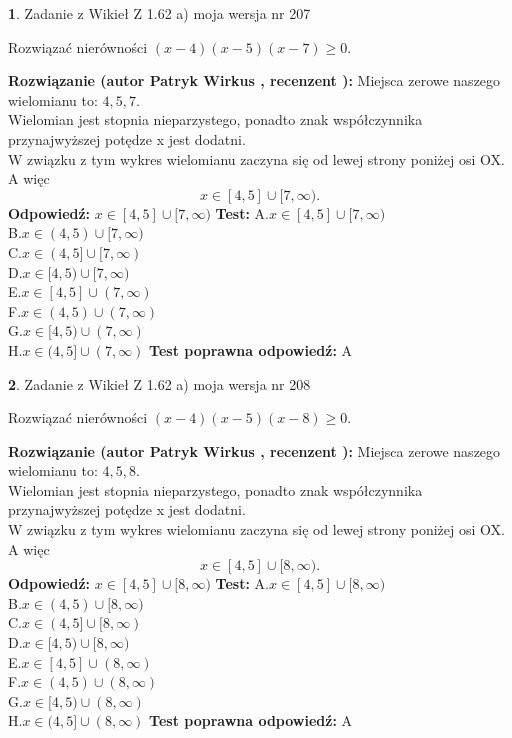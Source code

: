 \documentclass[12pt, a4paper]{article}
\theoremstyle{definition} %
\newtheorem{zad}{}
\newcommand{\zadStart}[1]{\begin{zad}#1\newline}
\newcommand{\zadStop}{\end{zad}}
\newcommand{\rozwStart}[2]{\noindent \textbf{Rozwiązanie (autor #1 , recenzent #2): }\newline}
\newcommand{\rozwStop}{\newline}
\newcommand{\odpStart}{\noindent \textbf{Odpowiedź:}\newline}
\newcommand{\odpStop}{\newline}
\newcommand{\testStart}{\noindent \textbf{Test:}\newline}
\newcommand{\testStop}{\newline}
\newcommand{\kluczStart}{\noindent \textbf{Test poprawna odpowiedź:}\newline}
\newcommand{\kluczStop}{\newline}
\begin{document}
\zadStart{Zadanie z Wikieł Z 1.62 a) moja wersja nr 207}

Rozwiązać nierówności $(x-4)(x-5)(x-7)\ge0$.
\zadStop
\rozwStart{Patryk Wirkus}{}
Miejsca zerowe naszego wielomianu to: $4, 5, 7$.\\
Wielomian jest stopnia nieparzystego, ponadto znak współczynnika przy\linebreak najwyższej potędze x jest dodatni.\\ W związku z tym wykres wielomianu zaczyna się od lewej strony poniżej osi OX. A więc $$x \in [4,5] \cup [7,\infty).$$
\rozwStop
\odpStart
$x \in [4,5] \cup [7,\infty)$
\odpStop
\testStart
A.$x \in [4,5] \cup [7,\infty)$\\
B.$x \in (4,5) \cup [7,\infty)$\\
C.$x \in (4,5] \cup [7,\infty)$\\
D.$x \in [4,5) \cup [7,\infty)$\\
E.$x \in [4,5] \cup (7,\infty)$\\
F.$x \in (4,5) \cup (7,\infty)$\\
G.$x \in [4,5) \cup (7,\infty)$\\
H.$x \in (4,5] \cup (7,\infty)$
\testStop
\kluczStart
A
\kluczStop



\zadStart{Zadanie z Wikieł Z 1.62 a) moja wersja nr 208}

Rozwiązać nierówności $(x-4)(x-5)(x-8)\ge0$.
\zadStop
\rozwStart{Patryk Wirkus}{}
Miejsca zerowe naszego wielomianu to: $4, 5, 8$.\\
Wielomian jest stopnia nieparzystego, ponadto znak współczynnika przy\linebreak najwyższej potędze x jest dodatni.\\ W związku z tym wykres wielomianu zaczyna się od lewej strony poniżej osi OX. A więc $$x \in [4,5] \cup [8,\infty).$$
\rozwStop
\odpStart
$x \in [4,5] \cup [8,\infty)$
\odpStop
\testStart
A.$x \in [4,5] \cup [8,\infty)$\\
B.$x \in (4,5) \cup [8,\infty)$\\
C.$x \in (4,5] \cup [8,\infty)$\\
D.$x \in [4,5) \cup [8,\infty)$\\
E.$x \in [4,5] \cup (8,\infty)$\\
F.$x \in (4,5) \cup (8,\infty)$\\
G.$x \in [4,5) \cup (8,\infty)$\\
H.$x \in (4,5] \cup (8,\infty)$
\testStop
\kluczStart
A
\kluczStop
\end{document}
